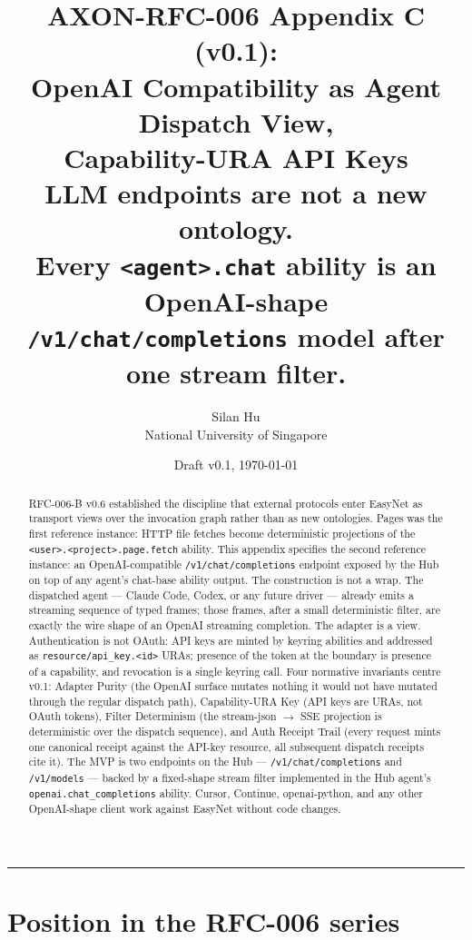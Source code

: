 \documentclass[11pt,a4paper]{article}
\title{
    \vspace{-2em}
    \textbf{\Large AXON-RFC-006 Appendix C (v0.1):}\\[0.2em]
    \textbf{\Large OpenAI Compatibility as Agent Dispatch View,}\\[0.1em]
    \textbf{\Large Capability-URA API Keys}\\[0.4em]
    \large LLM endpoints are not a new ontology.\\
    \large Every \texttt{<agent>.chat} ability is an OpenAI-shape\\
    \large \texttt{/v1/chat/completions} model after one stream filter.
}
\author{
    Silan Hu \\ \small National University of Singapore
}
\date{Draft v0.1, \today}
\theoremstyle{definition}
\begin{document}
\maketitle

\begin{abstract}
\noindent
RFC-006-B v0.6 established the discipline that external protocols
enter EasyNet as transport views over the invocation graph rather
than as new ontologies. Pages was the first reference instance:
HTTP file fetches become deterministic projections of the
\texttt{<user>.<project>.page.fetch} ability. This appendix
specifies the second reference instance: an OpenAI-compatible
\texttt{/v1/chat/completions} endpoint exposed by the Hub on top
of any agent's chat-base ability output. The construction is not
a wrap. The dispatched agent --- Claude Code, Codex, or any
future driver --- already emits a streaming sequence of typed
frames; those frames, after a small deterministic filter, are
exactly the wire shape of an OpenAI streaming completion. The
adapter is a view. Authentication is not OAuth: API keys are
minted by keyring abilities and addressed as
\texttt{resource/api\_key.<id>} URAs; presence of the token at
the boundary is presence of a capability, and revocation is a
single keyring call. Four normative invariants centre v0.1:
Adapter Purity (the OpenAI surface mutates nothing it would not
have mutated through the regular dispatch path), Capability-URA
Key (API keys are URAs, not OAuth tokens), Filter Determinism
(the stream-json $\to$ SSE projection is deterministic over the
dispatch sequence), and Auth Receipt Trail (every request mints
one canonical receipt against the API-key resource, all
subsequent dispatch receipts cite it). The MVP is two endpoints
on the Hub --- \texttt{/v1/chat/completions} and
\texttt{/v1/models} --- backed by a fixed-shape stream filter
implemented in the Hub agent's \texttt{openai.chat\_completions}
ability. Cursor, Continue, openai-python, and any other
OpenAI-shape client work against EasyNet without code changes.
\end{abstract}

\tableofcontents
\vspace{1em}
\hrule
\vspace{1em}

\section{Position in the RFC-006 series}
\label{sec:position}
\end{document}
